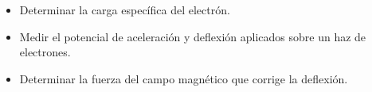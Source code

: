 \begin{itemize}
    \item Determinar la carga específica del electrón.
    \item Medir el potencial de aceleración y deflexión aplicados sobre un haz de electrones.
    \item Determinar la fuerza del campo magnético que corrige la deflexión.
\end{itemize}
